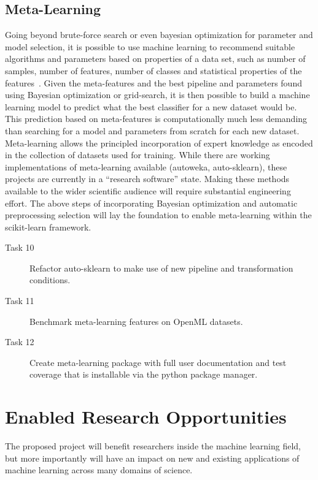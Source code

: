 \subsection{Meta-Learning}
Going beyond brute-force search or even bayesian optimization for parameter and
model selection, it is possible to use machine learning to recommend suitable
algorithms and parameters based on properties of a data set, such as number of
samples, number of features, number of classes and statistical properties of
the features~\cite{luo2015review, feurer-nips2015}.
Given the meta-features and the best pipeline and parameters found using
Bayesian optimization or grid-search, it is then possible to build a machine
learning model to predict what the best classifier for a new dataset would be.
This prediction based on meta-features is computationally much less demanding
than searching for a model and parameters from scratch for each new dataset.
Meta-learning allows the principled incorporation of expert knowledge as encoded
in the collection of datasets used for training.
While there are working implementations of meta-learning available (autoweka, auto-sklearn),
these projects are currently in a ``research software'' state. Making these methods
available to the wider scientific audience will require substantial engineering
effort. The above steps of incorporating Bayesian optimization and automatic
preprocessing selection will lay the foundation to enable meta-learning within the
scikit-learn framework.
\begin{description}
    \item [Task 10] Refactor auto-sklearn to make use of new pipeline and transformation conditions.
    \item [Task 11] Benchmark meta-learning features on OpenML datasets.
    \item [Task 12] Create meta-learning package with full user documentation
        and test coverage that is installable via the python package manager.
\end{description}

\section{Enabled Research Opportunities}
The proposed project will benefit researchers inside the machine learning field,
but more importantly will have an impact on new and existing applications of machine
learning across many domains of science.

